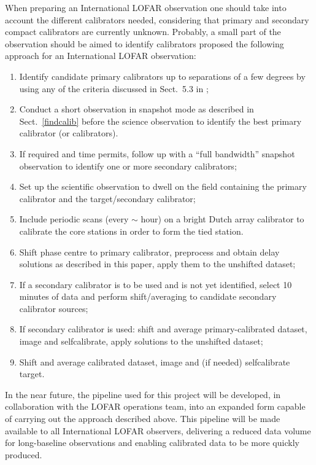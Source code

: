 \documentclass[graybox]{svmult}
\begin{document}
When preparing an International LOFAR observation one should take into account
the different calibrators needed, considering that primary and secondary
compact calibrators are currently unknown. Probably, a small part of the
observation should be aimed to identify calibrators \cite{moldon15} proposed
the following approach for an International LOFAR observation: 

\begin{enumerate}
\item Identify candidate primary calibrators up to separations of a few degrees 
    by using any of the criteria discussed in Sect.~5.3 in
    \cite{moldon15};
\item Conduct a short observation in snapshot mode as described
in Sect.~\ref{findcalib} before the science observation to identify
the best primary calibrator (or calibrators).
\item If required and time permits, follow up with a ``full bandwidth'' snapshot observation to 
identify one or more secondary calibrators;
\item Set up the scientific observation to dwell on the field 
containing the primary calibrator and the target/secondary calibrator;
\item Include periodic scans (every $\sim$ hour) on a bright Dutch array 
calibrator to calibrate the core stations in order to form the tied station.
\item Shift phase centre to primary calibrator, preprocess and obtain delay solutions 
as described in this paper, apply them to the unshifted dataset;
\item If a secondary calibrator is to be used and is not yet identified, select 10 minutes
of data and perform shift/averaging to candidate secondary calibrator sources;
\item If secondary calibrator is used: shift and average primary-calibrated dataset, 
image and selfcalibrate, apply solutions to the unshifted dataset;
\item Shift and average calibrated dataset, image and (if needed) selfcalibrate target.
\end{enumerate}

In the near future, the pipeline used for this project will be developed, in
collaboration with the LOFAR operations team, into an expanded form capable of
carrying out the approach described above.  This pipeline will be made available
to all International LOFAR observers, delivering a reduced data volume for
long-baseline observations and enabling calibrated data to be more quickly
produced.
\end{document}
